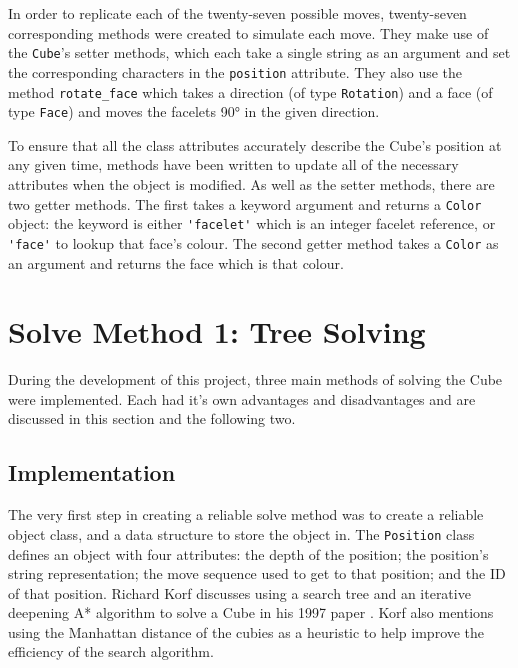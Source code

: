 \documentclass{report}
\begin{document}
    In order to replicate each of the twenty-seven possible moves, twenty-seven corresponding methods were created to simulate each move. They make use of the \lstinline|Cube|'s setter methods, which each take a single string as an argument and set the corresponding characters in the \lstinline|position| attribute. They also use the method \lstinline|rotate_face| which takes a direction (of type \lstinline|Rotation|) and a face (of type \lstinline|Face|) and moves the facelets \ang{90} in the given direction.
    
    To ensure that all the class attributes accurately describe the Cube's position at any given time, methods have been written to update all of the necessary attributes when the object is modified. As well as the setter methods, there are two getter methods. The first takes a keyword argument and returns a \lstinline|Color| object: the keyword is either \lstinline|'facelet'| which is an integer facelet reference, or \lstinline|'face'| to lookup that face's colour. The second getter method takes a \lstinline|Color| as an argument and returns the face which is that colour.
    
    \section{Solve Method 1: Tree Solving} \label{sec:treeSolving}
    
    During the development of this project, three main methods of solving the Cube were implemented. Each had it's own advantages and disadvantages and are discussed in this section and the following two.
    
    \subsection{Implementation}
    
    The very first step in creating a reliable solve method was to create a reliable object class, and a data structure to store the object in. The \lstinline|Position| class defines an object with four attributes: the depth of the position; the position's string representation; the move sequence used to get to that position; and the ID of that position. Richard Korf discusses using a search tree and an iterative deepening A* algorithm to solve a Cube in his 1997 paper \cite{Korf1997}. Korf also mentions using the Manhattan distance of the cubies as a heuristic to help improve the efficiency of the search algorithm. 
    
\end{document}
